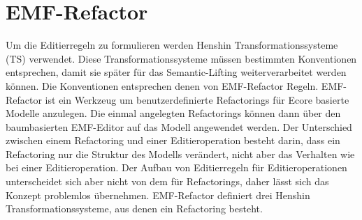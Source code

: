 \section{EMF-Refactor}

Um die Editierregeln zu formulieren werden Henshin Transformationssysteme (TS) verwendet. Diese
Transformationssysteme müssen bestimmten Konventionen entsprechen, damit sie später für das
Semantic-Lifting weiterverarbeitet werden können. Die Konventionen entsprechen denen von
EMF-Refactor Regeln. EMF-Refactor ist ein Werkzeug um benutzerdefinierte Refactorings für Ecore
basierte Modelle anzulegen. Die einmal angelegten Refactorings können dann über den baumbasierten
EMF-Editor auf das Modell angewendet werden.  Der Unterschied zwischen einem Refactoring und einer
Editieroperation besteht darin, dass ein Refactoring nur die Struktur des Modells verändert, nicht
aber das Verhalten wie bei einer Editieroperation. Der Aufbau von Editierregeln für
Editieroperationen unterscheidet sich aber nicht von dem für Refactorings, daher lässt sich das
Konzept problemlos übernehmen. EMF-Refactor definiert drei Henshin Transformationssysteme, aus denen
ein Refactoring besteht.

